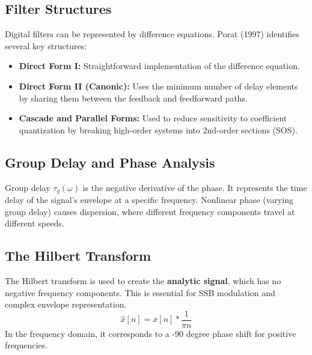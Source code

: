 \subsection{Filter Structures}
Digital filters can be represented by difference equations. Porat (1997) identifies several key structures:
\begin{itemize}
    \item \textbf{Direct Form I:} Straightforward implementation of the difference equation.
    \item \textbf{Direct Form II (Canonic):} Uses the minimum number of delay elements by sharing them between the feedback and feedforward paths.
    \item \textbf{Cascade and Parallel Forms:} Used to reduce sensitivity to coefficient quantization by breaking high-order systems into 2nd-order sections (SOS).
\end{itemize}

\subsection{Group Delay and Phase Analysis}
Group delay $\tau_g(\omega)$ is the negative derivative of the phase. It represents the time delay of the signal's envelope at a specific frequency. Nonlinear phase (varying group delay) causes dispersion, where different frequency components travel at different speeds.

\begin{center}
\end{center}

\subsection{The Hilbert Transform}
The Hilbert transform is used to create the \textbf{analytic signal}, which has no negative frequency components. This is essential for SSB modulation and complex envelope representation.
\begin{equation}
    \hat{x}[n] = x[n] * \frac{1}{\pi n}
\end{equation}
In the frequency domain, it corresponds to a -90 degree phase shift for positive frequencies.

